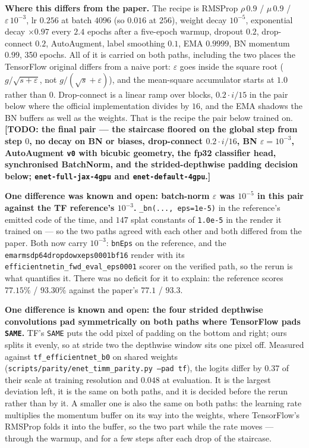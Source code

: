 \medskip\noindent\textbf{Where this differs from the paper.} The recipe is
RMSProp $\rho\,0.9$ / $\mu\,0.9$ / $\varepsilon\,10^{-3}$, lr $0.256$ at batch
$4096$ (so $0.016$ at $256$), weight decay $10^{-5}$, exponential decay
$\times 0.97$ every $2.4$ epochs after a five-epoch warmup, dropout $0.2$,
drop-connect $0.2$, AutoAugment, label smoothing $0.1$, EMA $0.9999$, BN momentum
$0.99$, 350 epochs. All of it is carried on both paths, including the two
places the TensorFlow original differs from a naive port: $\varepsilon$ goes
inside the square root ($g/\sqrt{s+\varepsilon}$, not
$g/(\sqrt{s}+\varepsilon)$), and the mean-square accumulator starts at $1.0$
rather than $0$. Drop-connect is a linear ramp over blocks, $0.2 \cdot
i/15$ in the pair below where the official implementation divides by $16$,
and the EMA shadows the BN buffers as well as the weights. That is the
recipe the pair below trained on.
\textbf{[TODO: the final pair --- the staircase floored on the global step
from step $0$, no decay on BN or biases, drop-connect $0.2 \cdot i/16$, BN
$\varepsilon = 10^{-3}$, AutoAugment \texttt{v0} with bicubic geometry, the
fp32 classifier head, synchronised BatchNorm, and the strided-depthwise
padding decision below; \texttt{enet-full-jax-4gpu} and
\texttt{enet-default-4gpu}.]}

\medskip\noindent\textbf{One difference was known and open: batch-norm
$\varepsilon$ was $10^{-5}$ in this pair against the TF reference's
$10^{-3}$.} \texttt{\_bn(..., eps=1e-5)} in the reference's emitted code of
the time, and $147$ splat constants of \texttt{1.0e-5} in the render it
trained on --- so the two paths agreed with each other and both differed from
the paper. Both now carry $10^{-3}$: \texttt{bnEps} on the reference, and
the \texttt{emarmsdp64dropdowxeps0001bf16} render with its
\texttt{efficientnetin\_fwd\_eval\_eps0001} scorer on the verified path, so
the rerun is what quantifies it. There was no deficit for it to explain: the
reference scores $77.15\%$ / $93.30\%$ against the paper's $77.1$ / $93.3$.

\medskip\noindent\textbf{One difference is known and open: the four strided
depthwise convolutions pad symmetrically on both paths where TensorFlow pads
\texttt{SAME}.} TF's \texttt{SAME} puts the odd pixel of padding on the
bottom and right; ours splits it evenly, so at stride two the depthwise
window sits one pixel off. Measured against \texttt{tf\_efficientnet\_b0} on
shared weights (\texttt{scripts/parity/\allowbreak enet\_timm\_parity.py
--pad tf}), the
logits differ by $0.37$ of their scale at training resolution and $0.048$
at evaluation. It is the largest deviation left, it is the same on both
paths, and it is decided before the rerun rather than by it. A smaller
one is also the same on both paths: the learning rate multiplies the
momentum buffer on its way into the weights, where TensorFlow's RMSProp
folds it into the buffer, so the two part while the rate moves --- through
the warmup, and for a few steps after each drop of the staircase.

